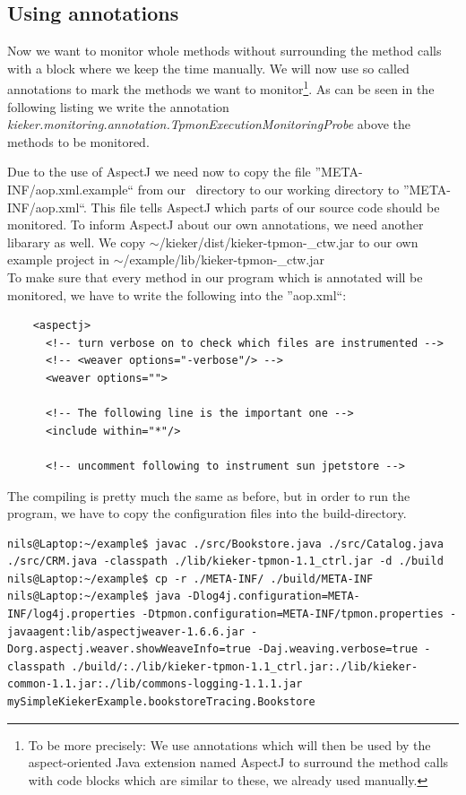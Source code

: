 \documentclass[a4paper, oneside, 11pt]{scrartcl}
\begin{document}
    \subsection{Using annotations}
      Now we want to monitor whole methods without surrounding the method calls with a block where we keep the time manually. We will now use so called annotations to mark the methods we want to monitor\footnote{To be more precisely: We use annotations which will then be used by the aspect-oriented Java extension named AspectJ to surround the method calls with code blocks which are similar to these, we already used manually.}. As can be seen in the following listing we write the annotation \textit{kieker.monitoring.annotation.TpmonExecutionMonitoringProbe} above the methods to be monitored. 
      \setJavaCodeListing
      \lstset{caption=Bookstore.java, label=listing:Bookstore2.java}
      
      Due to the use of AspectJ we need now to copy the file ''META-INF/aop.xml.example`` from our \Kieker\ directory to our working directory to ''META-INF/aop.xml``. This file tells AspectJ which parts of our source code should be monitored. To inform AspectJ about our own annotations, we need another libarary as well. We copy $\sim$/kieker/dist/kieker-tpmon-\version\_ctw.jar to our own example project in $\sim$/example/lib/kieker-tpmon-\version\_ctw.jar\\
      To make sure that every method in our program which is annotated will be monitored, we have to write the following into the ''aop.xml``:
      \setXMLListing 
      \begin{lstlisting}
	<aspectj>
	  <!-- turn verbose on to check which files are instrumented -->
	  <!-- <weaver options="-verbose"/> -->
	  <weaver options="">
	      
	  <!-- The following line is the important one -->
	  <include within="*"/> 

	  <!-- uncomment following to instrument sun jpetstore -->
      \end{lstlisting}
The compiling is pretty much the same as before, but in order to run the program, we have to copy the configuration files into the build-directory.
\begin{lstlisting}
nils@Laptop:~/example$ javac ./src/Bookstore.java ./src/Catalog.java ./src/CRM.java -classpath ./lib/kieker-tpmon-1.1_ctrl.jar -d ./build
nils@Laptop:~/example$ cp -r ./META-INF/ ./build/META-INF
nils@Laptop:~/example$ java -Dlog4j.configuration=META-INF/log4j.properties -Dtpmon.configuration=META-INF/tpmon.properties -javaagent:lib/aspectjweaver-1.6.6.jar -Dorg.aspectj.weaver.showWeaveInfo=true -Daj.weaving.verbose=true -classpath ./build/:./lib/kieker-tpmon-1.1_ctrl.jar:./lib/kieker-common-1.1.jar:./lib/commons-logging-1.1.1.jar mySimpleKiekerExample.bookstoreTracing.Bookstore
\end{lstlisting}
\end{document}
